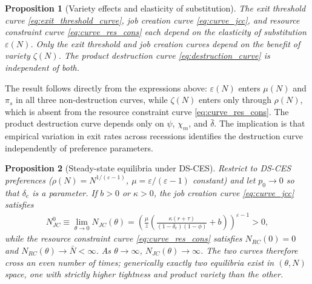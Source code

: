 \documentclass[authoryear, review, 12pt]{elsarticle}
\newtheorem{proposition}{Proposition}
\begin{document}
\begin{proposition}[Variety effects and elasticity 
	of substitution]\label{prop:curves}
	The exit threshold curve \eqref{eq:exit_threshold_curve}, 
	job creation curve \eqref{eq:curve_jcc}, and resource 
	constraint curve \eqref{eq:curve_res_cons} each depend 
	on the elasticity of substitution $\varepsilon(N)$. Only 
	the exit threshold and job creation curves depend on 
	the benefit of variety $\zeta(N)$. The product 
	destruction curve \eqref{eq:destruction_curve} is 
	independent of both.
	
\end{proposition}

The result follows directly from the expressions above: 
$\varepsilon(N)$ enters $\mu(N)$ and $\pi_s$ in all 
three non-destruction curves, while $\zeta(N)$ enters 
only through $\rho(N)$, which is absent from the 
resource constraint curve \eqref{eq:curve_res_cons}. 
The product destruction curve depends only on $\psi$, 
$\chi_m$, and $\bar{\delta}$. The implication is that 
empirical variation in exit rates across recessions 
identifies the destruction curve independently of 
preference parameters.

\begin{proposition}[Steady-state equilibria under DS-CES]
	\label{prop:equilibria}
	Restrict to DS-CES preferences ($\rho(N)=N^{1/(\varepsilon-1)}$,
	$\mu=\varepsilon/(\varepsilon-1)$ constant) and let $p_0\to 0$ so
	that $\delta_e$ is a parameter.  If $b>0$ or $\kappa>0$, the job
	creation curve \eqref{eq:curve_jcc} satisfies
	\begin{align}\label{eq:N_JC_intercept}
		N_{JC}^0 \equiv \lim_{\theta\to 0}N_{JC}(\theta)
		= \left(\frac{\mu}{z}
		\left(\frac{\kappa(r+\tau)}{(1-\delta_e)(1-\phi)}
		+b\right)\right)^{\varepsilon-1} > 0,
	\end{align}
	while the resource constraint curve \eqref{eq:curve_res_cons}
	satisfies $N_{RC}(0)=0$ and $N_{RC}(\theta)\to\bar{N}<\infty$.
	As $\theta\to\infty$, $N_{JC}(\theta)\to\infty$.  The two curves
	therefore cross an even number of times; generically exactly two
	equilibria exist in $(\theta,N)$ space, one with strictly higher
	tightness and product variety than the other.  
\end{proposition}
\end{document}
